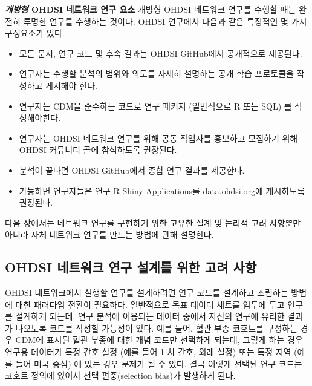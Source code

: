 \documentclass[11pt]{book}
\providecommand{\tightlist}{%
  \setlength{\itemsep}{0pt}\setlength{\parskip}{0pt}}
\theoremstyle{definition}
\theoremstyle{definition}
\theoremstyle{definition}
\theoremstyle{remark}
\begin{document}
\textbf{\emph{개방형} OHDSI 네트워크 연구 요소} 개방형 OHDSI 네트워크
연구를 수행할 때는 완전히 투명한 연구를 수행하는 것이다. OHDSI 연구에서
다음과 같은 특징적인 몇 가지 구성요소가 있다.

\begin{itemize}
\tightlist
\item
  모든 문서, 연구 코드 및 후속 결과는 OHDSI GitHub에서 공개적으로
  제공된다.
\item
  연구자는 수행할 분석의 범위와 의도를 자세히 설명하는 공개 학습
  프로토콜을 작성하고 게시해야 한다.
\item
  연구자는 CDM을 준수하는 코드로 연구 패키지 (일반적으로 R 또는 SQL) 를
  작성해야한다.
\item
  연구자는 OHDSI 네트워크 연구를 위해 공동 작업자를 홍보하고 모집하기
  위해 OHDSI 커뮤니티 콜에 참석하도록 권장된다.
\item
  분석이 끝나면 OHDSI GitHub에서 종합 연구 결과를 제공한다.
\item
  가능하면 연구자들은 연구 R Shiny Applications를
  \href{http://data.ohdsi.org}{data.ohdsi.org}에 게시하도록 권장된다.
\end{itemize}

다음 장에서는 네트워크 연구를 구현하기 위한 고유한 설계 및 논리적 고려
사항뿐만 아니라 자체 네트워크 연구를 만드는 방법에 관해 설명한다.

\subsection{OHDSI 네트워크 연구 설계를 위한 고려
사항}\label{ohdsi------}


OHDSI 네트워크에서 실행할 연구를 설계하려면 연구 코드를 설계하고
조립하는 방법에 대한 패러다임 전환이 필요하다. 일반적으로 목표 데이터
세트를 염두에 두고 연구를 설계하게 되는데, 연구 분석에 이용되는 데이터
중에서 자신의 연구에 유리한 결과가 나오도록 코드를 작성할 가능성이 있다.
예를 들어, 혈관 부종 코호트를 구성하는 경우 CDM에 표시된 혈관 부종에
대한 개념 코드만 선택하게 되는데, 그렇게 하는 경우 연구용 데이터가 특정
간호 설정 (예를 들어 1 차 간호, 외래 설정) 또는 특정 지역 (예를 들어
미국 중심) 에 있는 경우 문제가 될 수 있다. 결국 이렇게 선택된 연구
코드는 코호트 정의에 있어서 선택 편중(selection bias)가 발생하게 된다.
\end{document}
